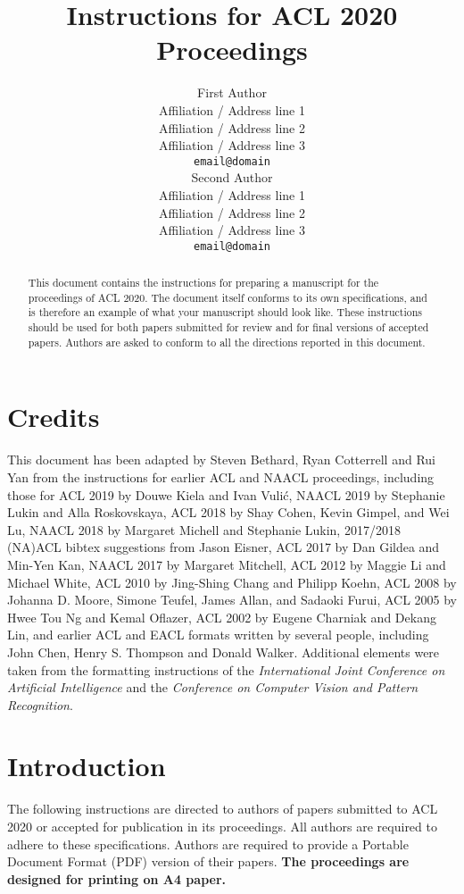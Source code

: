 \documentclass[11pt,a4paper]{article}
\title{Instructions for ACL 2020 Proceedings}
\author{First Author \\
  Affiliation / Address line 1 \\
  Affiliation / Address line 2 \\
  Affiliation / Address line 3 \\
  \texttt{email@domain} \\\And
  Second Author \\
  Affiliation / Address line 1 \\
  Affiliation / Address line 2 \\
  Affiliation / Address line 3 \\
  \texttt{email@domain} \\}
\date{}
\begin{document}
\maketitle
\begin{abstract}
This document contains the instructions for preparing a manuscript for the proceedings of ACL 2020.
The document itself conforms to its own specifications, and is therefore an example of what your manuscript should look like.
These instructions should be used for both papers submitted for review and for final versions of accepted papers.
Authors are asked to conform to all the directions reported in this document.
\end{abstract}

\section{Credits}

This document has been adapted
by Steven Bethard, Ryan Cotterrell and Rui Yan
from the instructions for earlier ACL and NAACL proceedings, including those for 
ACL 2019 by Douwe Kiela and Ivan Vuli\'{c},
NAACL 2019 by Stephanie Lukin and Alla Roskovskaya, 
ACL 2018 by Shay Cohen, Kevin Gimpel, and Wei Lu, 
NAACL 2018 by Margaret Michell and Stephanie Lukin,
2017/2018 (NA)ACL bibtex suggestions from Jason Eisner,
ACL 2017 by Dan Gildea and Min-Yen Kan, 
NAACL 2017 by Margaret Mitchell, 
ACL 2012 by Maggie Li and Michael White, 
ACL 2010 by Jing-Shing Chang and Philipp Koehn, 
ACL 2008 by Johanna D. Moore, Simone Teufel, James Allan, and Sadaoki Furui, 
ACL 2005 by Hwee Tou Ng and Kemal Oflazer, 
ACL 2002 by Eugene Charniak and Dekang Lin, 
and earlier ACL and EACL formats written by several people, including
John Chen, Henry S. Thompson and Donald Walker.
Additional elements were taken from the formatting instructions of the \emph{International Joint Conference on Artificial Intelligence} and the \emph{Conference on Computer Vision and Pattern Recognition}.

\section{Introduction}

The following instructions are directed to authors of papers submitted to ACL 2020 or accepted for publication in its proceedings.
All authors are required to adhere to these specifications.
Authors are required to provide a Portable Document Format (PDF) version of their papers.
\textbf{The proceedings are designed for printing on A4 paper.}
\end{document}
